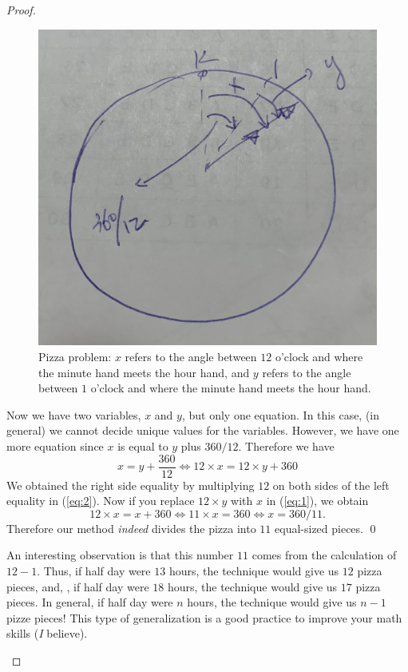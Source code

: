 \documentclass{article}
\begin{document}
\begin{proof}
\begin{enumerate}
\begin{figure}
\begin{center}
\includegraphics[width=.4\linewidth]{figures/pizza_HH_MH_angles}
\end{center}
\caption{Pizza problem: $x$ refers to the angle between $12$ o'clock and where the minute hand meets the hour hand,
and $y$ refers to the angle between $1$ o'clock and where the minute hand meets the hour hand.}
\label{fig:2}
\end{figure}

Now we have two variables, $x$ and $y$, but only one equation. In this case, (in general) we cannot decide
unique values for the variables.
However, we have one more equation
since $x$ is equal to $y$ plus $360/12$.
Therefore we have
\begin{equation}
\label{eq:2}
x = y + \frac{360}{12}
\Leftrightarrow
12 \times x = 12 \times y + 360
\end{equation}
We obtained the right side equality
by multiplying $12$ on both sides of the left equality in (\ref{eq:2}).
Now if you replace $12\times y$ with $x$ in (\ref{eq:1}),
we obtain
\begin{equation}
12 \times x = x + 360
\Leftrightarrow
11 \times x = 360
\Leftrightarrow
x = 360/11.
\end{equation}
Therefore our method \emph{indeed} divides the pizza into $11$ equal-sized pieces.
\qed

An interesting observation is that this number $11$ comes from the calculation of $12 - 1$.
Thus, if half day were $13$ hours, the technique would give us $12$ pizza pieces,
and, \eg, if half day were $18$ hours, the technique would give us $17$ pizza pieces.
In general, if half day were $n$ hours, the technique would give us $n-1$ pizze pieces!
This type of generalization is a good practice to improve your math skills (\emph{I} believe).

\end{enumerate}

\end{proof}
\end{document}
